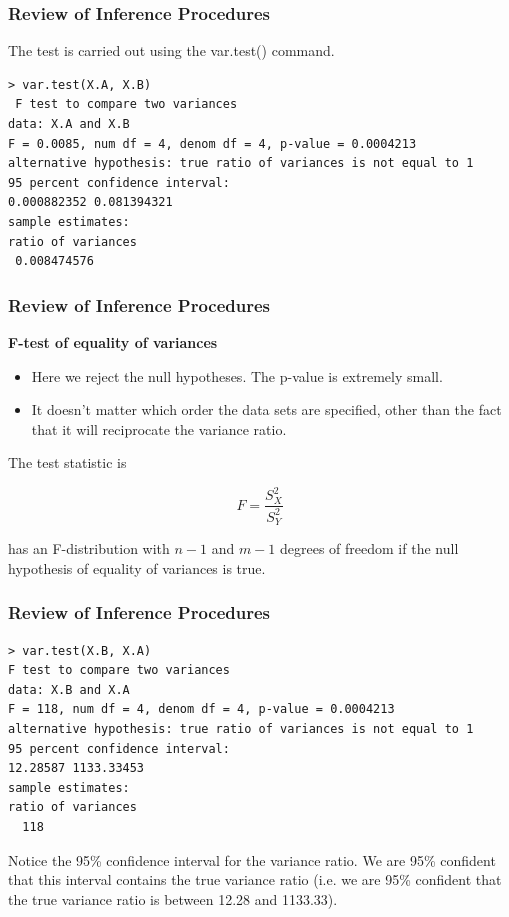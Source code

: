 \documentclass{beamer}
\begin{document}
\begin{frame}[fragile]
\frametitle{Review of Inference Procedures}
\Large

The test is carried out using the var.test() command.
\begin{framed}
	\begin{verbatim}> var.test(X.A, X.B)
 F test to compare two variances
data: X.A and X.B
F = 0.0085, num df = 4, denom df = 4, p-value = 0.0004213
alternative hypothesis: true ratio of variances is not equal to 1
95 percent confidence interval:
0.000882352 0.081394321
sample estimates:
ratio of variances
 0.008474576
\end{verbatim}

\end{framed}
\end{frame}
\begin{frame}
\frametitle{Review of Inference Procedures}
\large
\noindent \textbf{F-test of equality of variances}
\begin{itemize}
	\item 

Here we reject the null hypotheses. The p-value is extremely small.
\item It doesn’t matter which order the data sets are specified, other than
the fact that it will reciprocate the variance ratio.
\end{itemize}

The test statistic is

\begin{equation} F = \frac{S_X^2}{S_Y^2}\end{equation}

has an F-distribution with $n-1$ and $m-1$ degrees of freedom if the null hypothesis of equality of variances is true.

\end{frame}
\begin{frame}[fragile]
\frametitle{Review of Inference Procedures}
\large
\begin{framed}
	\begin{verbatim}
> var.test(X.B, X.A)
F test to compare two variances
data: X.B and X.A
F = 118, num df = 4, denom df = 4, p-value = 0.0004213
alternative hypothesis: true ratio of variances is not equal to 1
95 percent confidence interval:
12.28587 1133.33453
sample estimates:
ratio of variances
  118
\end{verbatim}

\end{framed}

Notice the 95\% confidence interval for the variance ratio. We are
95\% confident that this interval contains the true variance ratio
(i.e. we are 95\% confident that the true variance ratio is between
12.28 and 1133.33).

\end{frame}
\end{document}
